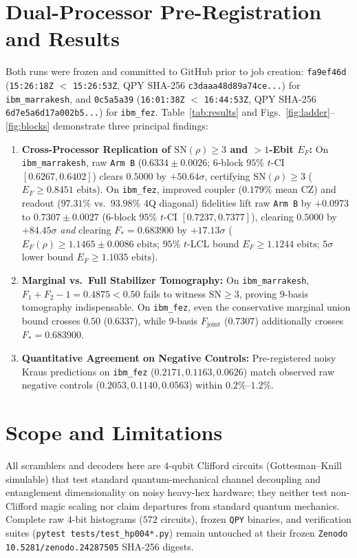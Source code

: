 \documentclass[11pt,twocolumn]{article}
\begin{document}
\section{Dual-Processor Pre-Registration and Results}
Both runs were frozen and committed to GitHub prior to job creation: \texttt{fa9ef46d} (\texttt{15:26:18Z} $<$ \texttt{15:26:53Z}, QPY SHA-256 \texttt{c3daaa48d89a74ce...}) for \texttt{ibm\_marrakesh}, and \texttt{0c5a5a39} (\texttt{16:01:38Z} $<$ \texttt{16:44:53Z}, QPY SHA-256 \texttt{6d7e5a6d17a002b5...}) for \texttt{ibm\_fez}. Table~\ref{tab:results} and Figs.~\ref{fig:ladder}--\ref{fig:blocks} demonstrate three principal findings:
\begin{enumerate}
\item \textbf{Cross-Processor Replication of $\mathrm{SN}(\rho)\ge 3$ and $>1$-Ebit $E_F$:} On \texttt{ibm\_marrakesh}, raw \texttt{Arm B} ($0.6334 \pm 0.0026$; $6$-block $95\%$ $t$-CI $[0.6267, 0.6402]$) clears $0.5000$ by $+50.64\sigma$, certifying $\mathrm{SN}(\rho)\ge 3$ ($E_F \ge 0.8451\text{ ebits}$). On \texttt{ibm\_fez}, improved coupler ($0.179\%$ mean CZ) and readout ($97.31\%$ vs.\ $93.98\%$ 4Q diagonal) fidelities lift raw \texttt{Arm B} by $+0.0973$ to $0.7307 \pm 0.0027$ ($6$-block $95\%$ $t$-CI $[0.7237, 0.7377]$), clearing $0.5000$ by $+84.45\sigma$ \emph{and} clearing $F_*=0.683900$ by $+17.13\sigma$ ($E_F(\rho)\ge 1.1465 \pm 0.0086\text{ ebits}$; $95\%$ $t$-LCL bound $E_F \ge 1.1244\text{ ebits}$; $5\sigma$ lower bound $E_F \ge 1.1035\text{ ebits}$).
\item \textbf{Marginal vs.\ Full Stabilizer Tomography:} On \texttt{ibm\_marrakesh}, $F_1+F_2-1 = 0.4875 < 0.50$ fails to witness $\mathrm{SN}\ge 3$, proving $9$-basis tomography indispensable. On \texttt{ibm\_fez}, even the conservative marginal union bound crosses $0.50$ ($0.6337$), while $9$-basis $F_{\mathrm{joint}}$ ($0.7307$) additionally crosses $F_*=0.683900$.
\item \textbf{Quantitative Agreement on Negative Controls:} Pre-registered noisy Kraus predictions on \texttt{ibm\_fez} ($0.2171, 0.1163, 0.0626$) match observed raw negative controls ($0.2053, 0.1140, 0.0563$) within $0.2\%\text{--}1.2\%$.
\end{enumerate}

\section{Scope and Limitations}
All scramblers and decoders here are $4$-qubit Clifford circuits (Gottesman--Knill simulable) that test standard quantum-mechanical channel decoupling and entanglement dimensionality on noisy heavy-hex hardware; they neither test non-Clifford magic scaling nor claim departures from standard quantum mechanics. Complete raw $4$-bit histograms ($572$ circuits), frozen \texttt{QPY} binaries, and verification suites (\texttt{pytest tests/test\_hp004*.py}) remain untouched at their frozen \texttt{Zenodo 10.5281/zenodo.24287505} SHA-256 digests.
\end{document}
